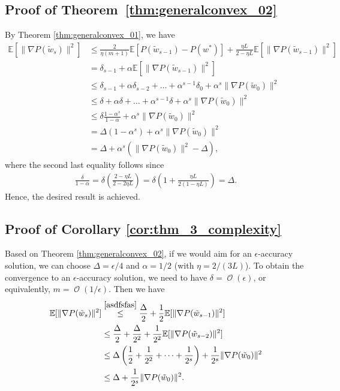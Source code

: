 \documentclass{article}
\DeclareMathOperator{\Ocal}{\mathcal{O}}
\begin{document}
\subsection{Proof of Theorem~\ref{thm:generalconvex_02}}
By Theorem \ref{thm:generalconvex_01}, we have
\begin{align*}
\mathbb{E}[ \| \nabla P(\tilde{w}_s)\|^2 ] & \leq \frac{2}{\eta(m + 1)} \mathbb{E}[ P(\tilde{w}_{s-1}) - P(w^{*})]  + \frac{ \eta L}{2 - \eta L}   \mathbb{E}[ \| \nabla P(\tilde{w}_{s-1})\|^2 ] \\
& = \delta_{s-1} + \alpha \mathbb{E}[ \| \nabla P(\tilde{w}_{s-1})\|^2 ] \\
& \leq \delta_{s-1} + \alpha \delta_{s-2} + \dots + \alpha^{s-1} \delta_{0} + \alpha^s \| \nabla P(\tilde{w}_{0})\|^2 \\
& \leq \delta + \alpha \delta + \dots + \alpha^{s-1} \delta + \alpha^s \| \nabla P(\tilde{w}_{0})\|^2 \\
& \leq \delta \frac{1 - \alpha^s}{1 - \alpha} + \alpha^s \| \nabla P(\tilde{w}_{0})\|^2 \\
& = \Delta(1 - \alpha^s) + \alpha^s  \| \nabla P(\tilde{w}_0)\|^2 \\
& = \Delta + \alpha^s ( \| \nabla P(\tilde{w}_0)\|^2 - \Delta),
\end{align*}
where the second last equality follows since
\begin{align*}
\frac{\delta}{1 - \alpha} = \delta \left( \frac{2 - \eta L}{2 - 2\eta L} \right) = \delta\left(1 + \frac{\eta L}{2(1 - \eta L)} \right) = \Delta. 
\end{align*}
Hence, the desired result is achieved. 


\subsection{Proof of Corollary \ref{cor:thm_3_complexity}}

Based on Theorem \ref{thm:generalconvex_02}, if we would aim for an $\epsilon$-accuracy solution, we can choose $\Delta = \epsilon/4$ and $\alpha=1/2$ (with $\eta = 2/(3 L)$). To obtain the convergence to an $\epsilon$-accuracy solution, we need to have $\delta = \Ocal(\epsilon)$, or equivalently, $m = \Ocal(1/\epsilon)$. Then we have
\begin{align*}
\mathbb{E}[ \| \nabla P(\tilde{w}_s)\|^2 ]
&\overset{\eqref{asdfsfas}}{\leq} \frac \Delta2 + \frac12 \mathbb{E}[ \| \nabla P(\tilde{w}_{s-1})\|^2 ] \\
&\leq \frac \Delta 2 + \frac\Delta{2^2} +\frac1{2^2} \mathbb{E}[ \| \nabla P(\tilde{w}_{s-2})\|^2 ]
\\
&\leq  \Delta \left(\frac12+\frac1{2^2}+\dots+\frac1{2^s}\right) +\frac1{2^s} \| \nabla P(\tilde{w}_{0})\|^2 \\
&\leq \Delta +\frac1{2^s} \| \nabla P(\tilde{w}_{0})\|^2.
\end{align*}
\end{document}
